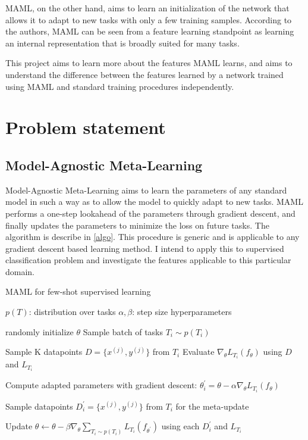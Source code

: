 \documentclass[10pt,twocolumn,letterpaper]{article}
\begin{document}
MAML, on the other hand, aims to learn an initialization of the network that allows it to adapt to new tasks with only a few training samples. According to the authors, MAML can be seen from a feature learning standpoint as learning an internal representation that is broadly suited for many tasks. 

This project aims to learn more about the features MAML learns, and aims to understand the difference between the features learned by a network trained using MAML and standard training procedures independently.


\section{Problem statement}

\subsection{Model-Agnostic Meta-Learning}

Model-Agnostic Meta-Learning aims to learn the parameters of any standard model in such a way as to allow the model to quickly adapt to new tasks. MAML performs a one-step lookahead of the parameters through gradient descent, and finally updates the parameters to minimize the loss on future tasks. The algorithm is describe in \ref{algo}. This procedure is generic and is applicable to any gradient descent based learning method. I intend to apply this to supervised classification problem and investigate the features applicable to this particular domain.

\begin{algorithm}
  \caption{MAML for few-shot supervised learning}
  \label{algo}
  \begin{algorithmic}[1]
  \Require $p(T)$: distribution over tasks
  \Require $\alpha, \beta$: step size hyperparameters
  
  \State randomly initialize $\theta$
	\State Sample batch of tasks $T_i \sim p(T_i)$  
	
	
	\State Sample K datapoints $D = \{x^{(j)}, y^{(j)}\}$ from $T_i$
	\State Evaluate $\nabla_\theta L_{T_i}(f_\theta)$ using $D$ and $L_{T_i}$
	
	\State Compute adapted parameters with gradient descent:
	$\theta_i^{'} = \theta - \alpha \nabla_{\theta} L_{T_i} (f_\theta)$
	
	\State Sample datapoints $D_i^{'} = \{x^{(j)}, y^{(j)}\}$  from $T_i$ for the meta-update
	
	\EndFor
	
	\State Update $\theta \leftarrow \theta - \beta \nabla_\theta \sum_{T_i \sim p(T_i)} L_{T_i}(f_{\theta^{'}})$ using each $D_i^{'}$ and $L_{T_i}$
  
  \EndWhile
  \end{algorithmic}
\end{algorithm}
\end{document}
